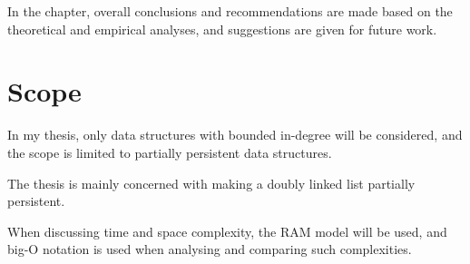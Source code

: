 In the  chapter, overall conclusions and
recommendations are made based on the theoretical and empirical analyses, and
suggestions are given for future work.

\section{Scope}

In my thesis, only data structures with bounded in-degree will be considered,
and the scope is limited to partially persistent data structures.

The thesis is mainly concerned with making a doubly linked list partially
persistent.

When discussing time and space complexity, the RAM model will be used, and
big-O notation is used when analysing and comparing such complexities.
